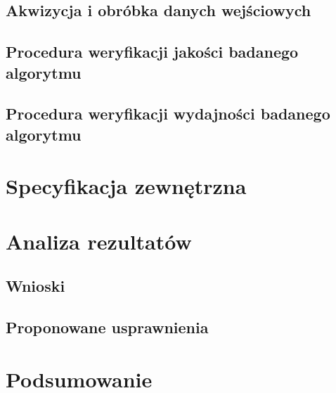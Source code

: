 \section{Akwizycja i obróbka danych wejściowych}\label{Section_DefinicjeGestow}

\section{Procedura weryfikacji jakości badanego algorytmu}\label{Section_Jakosc}

\section{Procedura weryfikacji wydajności badanego algorytmu}\label{Section_Wydajnosc}

\chapter{Specyfikacja zewnętrzna}\label{Chapter_SpecyfikacjaZewnetrzna}

\chapter{Analiza rezultatów}\label{Chapter_AnalizaRezultatow}

\section{Wnioski}\label{Section_Wnioski}

\section{Proponowane usprawnienia}\label{Section_Usprawnienia}
\cite{HandOverFaceOcclusion07}

\chapter{Podsumowanie}\label{Section_Podsumowanie}